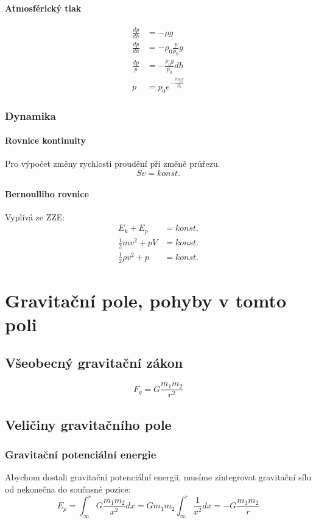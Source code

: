 \documentclass[titlepage]{report}
\begin{document}
\subsubsection{Atmosférický tlak}
\begin{align}
\frac{dp}{dh} &= -\rho g\\
\frac{dp}{dh} &= -\rho_0 \frac{p}{p_0} g\\
\frac{dp}{p} &= -\frac{\rho_0 g}{p_0} dh\\
p &= p_0 e^{-\frac{h \rho_0 g}{p_0}}
\end{align}
\subsection{Dynamika}
\subsubsection{Rovnice kontinuity}
Pro výpočet změny rychlosti proudění při změně průřezu.\\
\begin{equation}
Sv = konst.
\end{equation}
\subsubsection{Bernoulliho rovnice}
Vyplívá ze ZZE:\\
\begin{align}
E_k + E_p &= konst.\\
\frac{1}{2}mv^2 + p V &= konst.\\
\frac{1}{2} \rho v^2 + p &= konst.
\end{align}
\chapter{Gravitační pole, pohyby v tomto poli}
\section{Všeobecný gravitační zákon}
\begin{equation}
F_g = G \frac{m_1m_2}{r^2}
\end{equation}
\section{Veličiny gravitačního pole}
\subsection{Gravitační potenciální energie}
Abychom dostali gravitační potenciální energii, musíme zintegrovat gravitační sílu od nekonečna do současné pozice:\\
\begin{equation}
E_p = \int^r_{\infty} G \frac{m_1m_2}{x^2} dx = G m_1 m_2 \int^r_{\infty} \frac{1}{x^2} dx = -G\frac{m_1 m_2}{r}
\end{equation}
\end{document}
